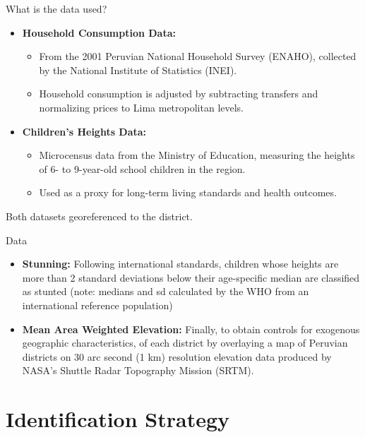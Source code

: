 \documentclass[notes,11pt, aspectratio=169]{beamer}
\begin{document}
\begin{frame}{What is the data used?}
    \begin{itemize}
        \item \textbf{Household Consumption Data:}
            \begin{itemize}
                \item From the 2001 Peruvian National Household Survey (ENAHO), collected by the National Institute of Statistics (INEI).
                \item Household consumption is adjusted by subtracting transfers and normalizing prices to Lima metropolitan levels.
            \end{itemize}
        \item \textbf{Children’s Heights Data:}
            \begin{itemize}
                \item Microcensus data from the Ministry of Education, measuring the heights of 6- to 9-year-old school children in the region.
                \item Used as a proxy for long-term living standards and health outcomes.
            \end{itemize}
    \end{itemize}
    \vspace{3mm}
Both datasets georeferenced to the district.
\end{frame}

\begin{frame}{Data}
\begin{itemize}
    \item \textbf{Stunning:} Following international standards, children whose heights are more than 2 standard deviations below their age-specific median are classified as stunted (note: medians and sd calculated by the WHO from an international reference population)
    \item  \textbf{Mean Area Weighted Elevation:} Finally, to obtain controls for exogenous geographic characteristics, of each district by overlaying a map of Peruvian districts on 30 arc second (1 km) resolution elevation data produced by NASA’s Shuttle Radar Topography Mission (SRTM).
\end{itemize}
\end{frame}



\section{Identification Strategy}
\end{document}
